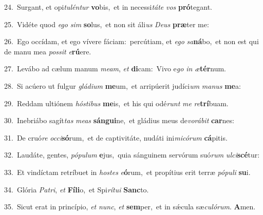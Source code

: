 {\numbfont\textcolor{\numbcolor}{24.}}~Surgant, et opi\-\textit{tu}\-\textit{lén}\textit{tur} \textbf{vo}\-bis,~\star et in necessi\-\textit{tá}\-\textit{te} \textit{vos} \textbf{pró}\-tegant.\par
{\numbfont\textcolor{\numbcolor}{25.}}~Vidéte quod \textit{e}\-\textit{go} \textit{sim} \textbf{so}\-lus,~\star et non sit áli\textit{us} \textit{De}\-\textit{us} \textbf{præ}\-ter me:\par
{\numbfont\textcolor{\numbcolor}{26.}}~Ego occídam, et ego vívere fáciam:~\dagger percútiam, et \textit{e}\-\textit{go} \textit{sa}\-\textbf{ná}bo,~\star et non est qui de manu mea \textit{pos}\-\textit{sit} \textit{e}\-\textbf{rú}ere.\par
{\numbfont\textcolor{\numbcolor}{27.}}~Levábo ad cælum manum \textit{me}\-\textit{am}, \textit{et} \textbf{di}\-cam:~\star Vivo e\textit{go} \textit{in} \textit{æ}\-\textbf{tér}num.\par
{\numbfont\textcolor{\numbcolor}{28.}}~Si acúero ut fulgur \textit{glá}\-\textit{di}\textit{um} \textbf{me}\-um,~\star et arripúerit judíci\textit{um} \textit{ma}\-\textit{nus} \textbf{me}\-a:\par
{\numbfont\textcolor{\numbcolor}{29.}}~Reddam ultiónem \textit{hós}\-\textit{ti}\textit{bus} \textbf{me}\-is,~\star et his qui odé\textit{runt} \textit{me} \textit{re}\-\textbf{trí}buam.\par
{\numbfont\textcolor{\numbcolor}{30.}}~Inebriábo sagít\textit{tas} \textit{me}\-\textit{as} \textbf{sán}\-\textbf{gui}ne,~\star et gládius meus de\-\textit{vo}\-\textit{rá}\textit{bit} \textbf{car}\-nes:\par
{\numbfont\textcolor{\numbcolor}{31.}}~De cruó\textit{re} \textit{oc}\-\textit{ci}\textbf{só}rum,~\star et de captivitáte, nudáti ini\-\textit{mi}\-\textit{có}\textit{rum} \textbf{cá}\-pitis.\par
{\numbfont\textcolor{\numbcolor}{32.}}~Laudáte, gentes, \textit{pó}\-\textit{pu}\textit{lum} \textbf{e}\-jus,~\star quia sánguinem servórum suó\textit{rum} \textit{ul}\-\textit{ci}\textbf{scé}tur:\par
{\numbfont\textcolor{\numbcolor}{33.}}~Et vindíctam retríbuet in \textit{hos}\-\textit{tes} \textit{e}\-\textbf{ó}rum,~\star et propítius erit terræ \textit{pó}\-\textit{pu}\textit{li} \textbf{su}\-i.\par
{\numbfont\textcolor{\numbcolor}{34.}}~Glória \textit{Pa}\-\textit{tri}, \textit{et} \textbf{Fí}\-\textbf{li}o,~\star et Spi\-\textit{rí}\-\textit{tu}\textit{i} \textbf{Sanc}\-to.\par
{\numbfont\textcolor{\numbcolor}{35.}}~Sicut erat in princípio, \textit{et} \textit{nunc}\-, \textit{et} \textbf{sem}\-per,~\star et in sǽcula sæ\-\textit{cu}\-\textit{ló}\textit{rum}. \textbf{A}\-men.\par
